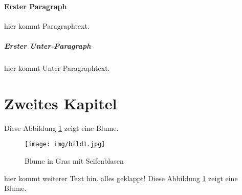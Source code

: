\documentclass[11pt]{article}
\begin{document}
\paragraph{Erster Paragraph}
hier kommt Paragraphtext.

\subparagraph{Erster Unter-Paragraph}
hier kommt Unter-Paragraphtext.

\newpage
\section{Zweites Kapitel}

Diese Abbildung \ref{fig: Blume} zeigt eine Blume.

\begin{figure}[H]
    \centering
    \texttt{[image: img/bild1.jpg]}
    \caption[Blume]{Blume in Gras mit Seifenblasen}
    \label{fig: Blume}
\end{figure}
hier kommt weiterer Text hin.
alles geklappt!
Diese Abbildung \ref{fig: Blume} zeigt eine Blume.
\end{document}
